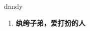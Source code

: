 
\begin{frame}
{\huge dandy}
\begin{center}
\begin{enumerate}\Large
  \item \textbf{纨绔子弟，爱打扮的人}
\end{enumerate}
\end{center}
\end{frame}

